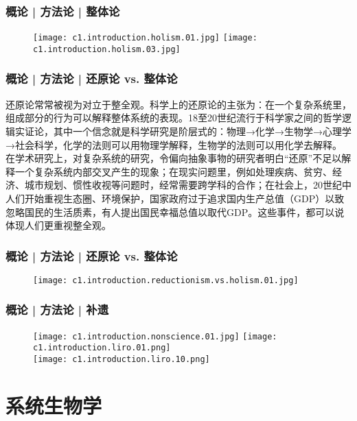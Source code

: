 \begin{frame}
  \frametitle{概论 | 方法论 | 整体论}
  \begin{figure}
    \centering
    \texttt{[image: c1.introduction.holism.01.jpg]}\quad
    \texttt{[image: c1.introduction.holism.03.jpg]}
  \end{figure}
\end{frame}

\begin{frame}
  \frametitle{概论 | 方法论 | 还原论 vs. 整体论}
还原论常常被视为对立于整全观。科学上的还原论的主张为：在一个复杂系统里，组成部分的行为可以解释整体系统的表现。18至20世纪流行于科学家之间的哲学逻辑实证论，其中一个信念就是科学研究是阶层式的：物理→化学→生物学→心理学→社会科学，化学的法则可以用物理学解释，生物学的法则可以用化学去解释。\\
\vspace{1em}
在学术研究上，对复杂系统的研究，令偏向抽象事物的研究者明白“还原”不足以解释一个复杂系统内部交叉产生的现象；在现实问题里，例如处理疾病、贫穷、经济、城市规划、惯性收视等问题时，经常需要跨学科的合作；在社会上，20世纪中人们开始重视生态圈、环境保护，国家政府过于追求国内生产总值（GDP）以致忽略国民的生活质素，有人提出国民幸福总值以取代GDP。这些事件，都可以说体现人们更重视整全观。
\end{frame}

\begin{frame}
  \frametitle{概论 | 方法论 | 还原论 vs. 整体论}
  \begin{figure}
    \centering
    \texttt{[image: c1.introduction.reductionism.vs.holism.01.jpg]}
  \end{figure}
\end{frame}

\begin{frame}
  \frametitle{概论 | 方法论 | 补遗}
  \begin{figure}
    \centering
    \texttt{[image: c1.introduction.nonscience.01.jpg]}\qquad
    \texttt{[image: c1.introduction.liro.01.png]}\\
    \vspace{1em}
    \texttt{[image: c1.introduction.liro.10.png]}
  \end{figure}
\end{frame}

\section{系统生物学}
